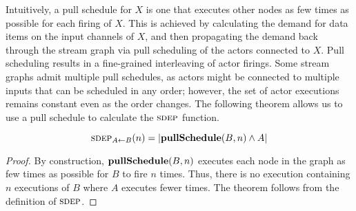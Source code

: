 \documentclass{sig-alternate}
\begin{document}
Intuitively, a pull schedule for $X$ is one that executes other nodes
as few times as possible for each firing of $X$.  This is achieved by
calculating the demand for data items on the input channels of $X$,
and then propagating the demand back through the stream graph via pull
scheduling of the actors connected to $X$.  Pull scheduling results in
a fine-grained interleaving of actor firings.  Some stream graphs
admit multiple pull schedules, as actors might be connected to
multiple inputs that can be scheduled in any order; however, the set
of actor executions remains constant even as the order changes.  The
following theorem allows us to use a pull schedule to calculate the
$\textsc{sdep}$ function.
\begin{theorem} 
\label{thm1}
\[
\sdepf{A}{B}(n) = |{\bf pullSchedule}(B, n) \wedge A|
\]
\end{theorem}
\begin{proof}
By construction, ${\bf pullSchedule}(B, n)$ executes each node in the
graph as few times as possible for $B$ to fire $n$ times.  Thus, there
is no execution containing $n$ executions of $B$ where $A$ executes
fewer times.  The theorem follows from the definition of $\textsc{sdep}$.
\end{proof}
\end{document}
